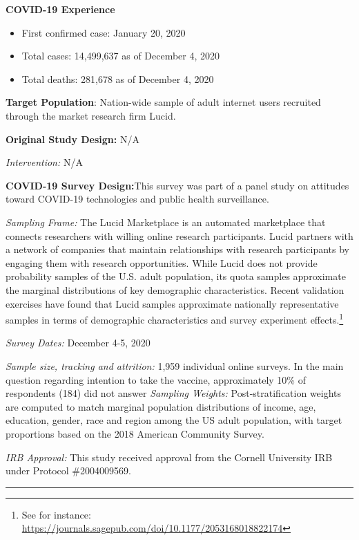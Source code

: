 \documentclass[
  12pt,
]{article}
\begin{document}
\textbf{COVID-19 Experience}

\begin{itemize}
        \item First confirmed case: January 20, 2020
        \item Total cases:  14,499,637 as of December 4, 2020 
        \item Total deaths:  281,678 as of December 4, 2020 
\end{itemize}

\textbf{Target Population}: Nation-wide sample of adult internet users recruited through the market research firm Lucid.

\textbf{Original Study Design:} N/A

\emph{Intervention:} N/A

\textbf{COVID-19 Survey Design:}This survey was part of a panel study on attitudes toward COVID-19 technologies and public health surveillance.

\emph{Sampling Frame:} The Lucid Marketplace is an automated marketplace that connects researchers with willing online research participants. Lucid partners with a network of companies that maintain relationships with research participants by engaging them with research opportunities. While Lucid does not provide probability samples of the U.S. adult population, its quota samples approximate the marginal distributions of key demographic characteristics. Recent validation exercises have found that Lucid samples approximate nationally representative samples in terms of demographic characteristics and survey experiment effects.\footnote{See for instance: \url{https://journals.sagepub.com/doi/10.1177/2053168018822174}}

\emph{Survey Dates:} December 4-5, 2020

\emph{Sample size, tracking and attrition:} 1,959 individual online surveys. In the main question regarding intention to take the vaccine, approximately 10\% of respondents (184) did not answer
\emph{Sampling Weights:} Post-stratification weights are computed to match marginal population distributions of income, age, education, gender, race and region among the US adult population, with target proportions based on the 2018 American Community Survey.

\emph{IRB Approval:} This study received approval from the Cornell University IRB under Protocol \#2004009569.

\begin{center}\rule{0.5\linewidth}{0.5pt}\end{center}

\newpage
\end{document}
